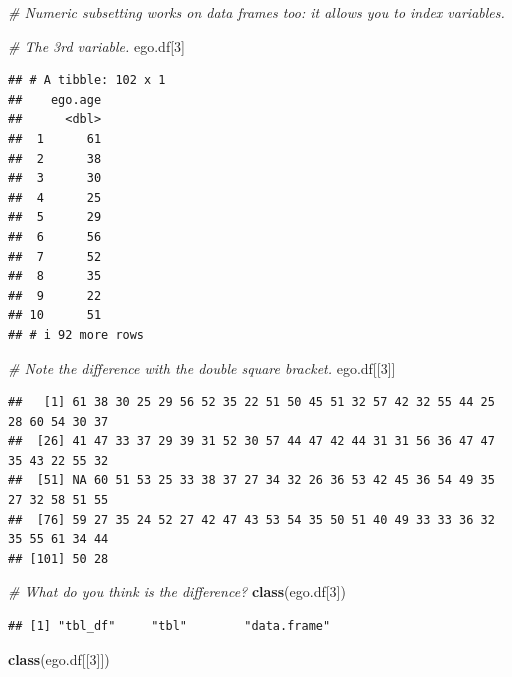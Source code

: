 \documentclass[
]{book}
\newenvironment{Shaded}{\begin{snugshade}}{\end{snugshade}}
\newcommand{\CommentTok}[1]{\textcolor[rgb]{0.56,0.35,0.01}{\textit{#1}}}
\newcommand{\DecValTok}[1]{\textcolor[rgb]{0.00,0.00,0.81}{#1}}
\newcommand{\FunctionTok}[1]{\textcolor[rgb]{0.13,0.29,0.53}{\textbf{#1}}}
\newcommand{\NormalTok}[1]{#1}
\begin{document}
\begin{Shaded}
\begin{Highlighting}[]
\CommentTok{\# Numeric subsetting works on data frames too: it allows you to index variables.}

\CommentTok{\# The 3rd variable.}
\NormalTok{ego.df[}\DecValTok{3}\NormalTok{]}
\end{Highlighting}
\end{Shaded}

\begin{verbatim}
## # A tibble: 102 x 1
##    ego.age
##      <dbl>
##  1      61
##  2      38
##  3      30
##  4      25
##  5      29
##  6      56
##  7      52
##  8      35
##  9      22
## 10      51
## # i 92 more rows
\end{verbatim}

\begin{Shaded}
\begin{Highlighting}[]
\CommentTok{\# Note the difference with the double square bracket.}
\NormalTok{ego.df[[}\DecValTok{3}\NormalTok{]]}
\end{Highlighting}
\end{Shaded}

\begin{verbatim}
##   [1] 61 38 30 25 29 56 52 35 22 51 50 45 51 32 57 42 32 55 44 25 28 60 54 30 37
##  [26] 41 47 33 37 29 39 31 52 30 57 44 47 42 44 31 31 56 36 47 47 35 43 22 55 32
##  [51] NA 60 51 53 25 33 38 37 27 34 32 26 36 53 42 45 36 54 49 35 27 32 58 51 55
##  [76] 59 27 35 24 52 27 42 47 43 53 54 35 50 51 40 49 33 33 36 32 35 55 61 34 44
## [101] 50 28
\end{verbatim}

\begin{Shaded}
\begin{Highlighting}[]
\CommentTok{\# What do you think is the difference?}
\FunctionTok{class}\NormalTok{(ego.df[}\DecValTok{3}\NormalTok{])}
\end{Highlighting}
\end{Shaded}

\begin{verbatim}
## [1] "tbl_df"     "tbl"        "data.frame"
\end{verbatim}

\begin{Shaded}
\begin{Highlighting}[]
\FunctionTok{class}\NormalTok{(ego.df[[}\DecValTok{3}\NormalTok{]])}
\end{Highlighting}
\end{Shaded}
\end{document}
